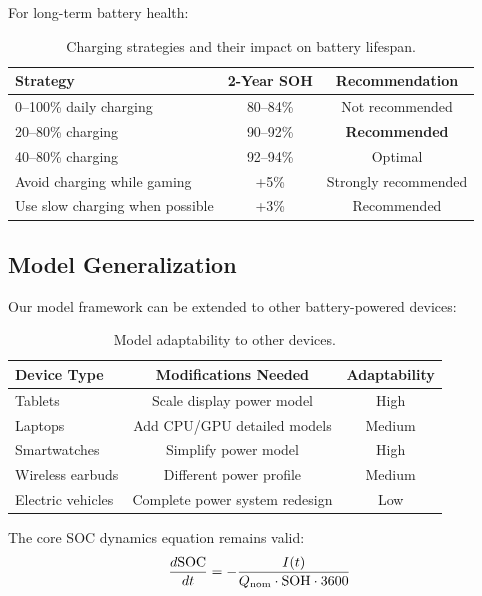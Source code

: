 For long-term battery health:

\begin{table}[H]
    \centering
    \caption{Charging strategies and their impact on battery lifespan.}
    \label{tab:charging_strategy}
    \begin{tabular}{lcc}
        \toprule
        \textbf{Strategy} & \textbf{2-Year SOH} & \textbf{Recommendation} \\
        \midrule
        0--100\% daily charging & 80--84\% & Not recommended \\
        20--80\% charging & 90--92\% & \textbf{Recommended} \\
        40--80\% charging & 92--94\% & Optimal \\
        Avoid charging while gaming & +5\% & Strongly recommended \\
        Use slow charging when possible & +3\% & Recommended \\
        \bottomrule
    \end{tabular}
\end{table}

\subsection{Model Generalization}
\label{subsec:generalization}

Our model framework can be extended to other battery-powered devices:

\begin{table}[H]
    \centering
    \caption{Model adaptability to other devices.}
    \label{tab:generalization}
    \begin{tabular}{lcc}
        \toprule
        \textbf{Device Type} & \textbf{Modifications Needed} & \textbf{Adaptability} \\
        \midrule
        Tablets & Scale display power model & High \\
        Laptops & Add CPU/GPU detailed models & Medium \\
        Smartwatches & Simplify power model & High \\
        Wireless earbuds & Different power profile & Medium \\
        Electric vehicles & Complete power system redesign & Low \\
        \bottomrule
    \end{tabular}
\end{table}

The core SOC dynamics equation remains valid:
\begin{equation}
    \frac{d\text{SOC}}{dt} = -\frac{I(t)}{Q_{\text{nom}} \cdot \text{SOH} \cdot 3600}
\end{equation}

